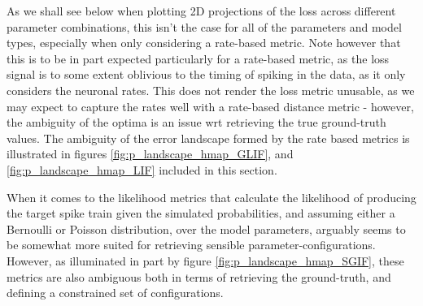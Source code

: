 \documentclass[mphil,deptreport,ianc]{infthesis} %
\begin{document}
As we shall see below when plotting 2D projections of the loss across different parameter combinations, this isn't the case for all of the parameters and model types, especially when only considering a rate-based metric.
Note however that this is to be in part expected particularly for a rate-based metric, as the loss signal is to some extent oblivious to the timing of spiking in the data, as it only considers the neuronal rates.
This does not render the loss metric unusable, as we may expect to capture the rates well with a rate-based distance metric - however, the ambiguity of the optima is an issue wrt retrieving the true ground-truth values.
The ambiguity of the error landscape formed by the rate based metrics is illustrated in figures \ref{fig:p_landscape_hmap_GLIF}, and \ref{fig:p_landscape_hmap_LIF} included in this section.

When it comes to the likelihood metrics that calculate the likelihood of producing the target spike train given the simulated probabilities, and assuming either a Bernoulli or Poisson distribution, over the model parameters, arguably seems to be somewhat more suited for retrieving sensible parameter-configurations.
However, as illuminated in part by figure \ref{fig:p_landscape_hmap_SGIF}, these metrics are also ambiguous both in terms of retrieving the ground-truth, and defining a constrained set of configurations.

\end{document}
